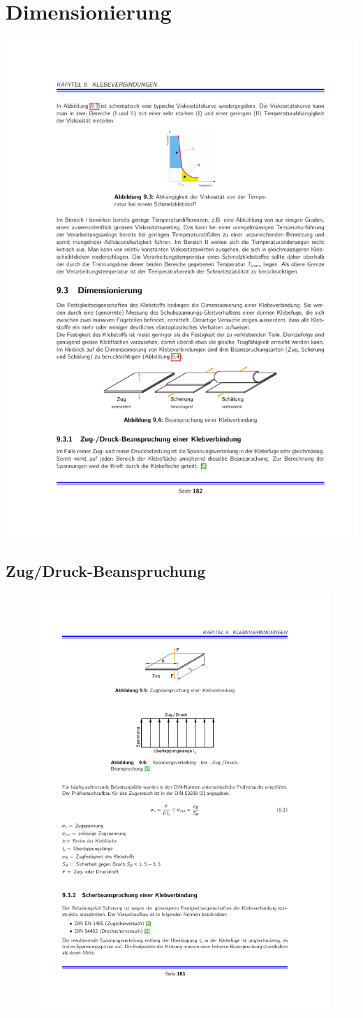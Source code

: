 \section{Dimensionierung} %
	\includegraphics[width=\columnwidth]{graphics/klebstoffe_dimensionierung}

	\subsection{Zug/Druck-Beanspruchung} %
		\begin{figure}
			\vspace{-1.2cm}
			\includegraphics[width=.45\columnwidth]{graphics/klebe_zug}
		\end{figure}
		
